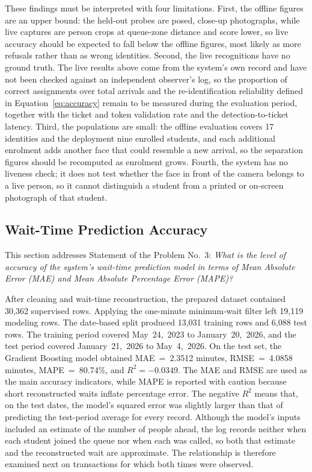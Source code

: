 \documentclass{research}
\begin{document}
These findings must be interpreted with four limitations. First, the
offline figures are an upper bound: the held-out probes are posed,
close-up photographs, while live captures are person crops at
queue-zone distance and score lower, so live accuracy should be expected
to fall below the offline figures, most likely as more refusals rather
than as wrong identities. Second, the live recognitions have no ground
truth. The live results above come from the system's own record and
have not been checked against an independent observer's log, so the
proportion of correct assignments over total arrivals and the
re-identification reliability defined in Equation~\ref{eq:accuracy}
remain to be measured during the evaluation period, together with the
ticket and token validation rate and the detection-to-ticket latency.
Third, the populations are small: the offline evaluation covers 17
identities and the deployment nine enrolled students, and each
additional enrolment adds another face that could resemble a new
arrival, so the separation figures should be recomputed as enrolment
grows. Fourth, the system has no liveness check; it does not test
whether the face in front of the camera belongs to a live person, so it
cannot distinguish a student from a printed or on-screen photograph of
that student.

\subsection{Wait-Time Prediction Accuracy}
\label{sec:sop3-results}

This section addresses Statement of the Problem No.~3: \emph{What is
the level of accuracy of the system's wait-time prediction model in
terms of Mean Absolute Error (MAE) and Mean Absolute Percentage Error
(MAPE)?}

\label{sec:wait-time-training-result}
After cleaning and wait-time reconstruction, the prepared dataset
contained 30,362 supervised rows. Applying the one-minute minimum-wait
filter left 19,119 modeling rows. The date-based split produced 13,031
training rows and 6,088 test rows. The training period covered
May~24,~2023 to January~20,~2026, and the test period covered
January~21,~2026 to May~4,~2026. On the test set, the Gradient
Boosting model obtained MAE~=~2.3512 minutes, RMSE~=~4.0858 minutes,
MAPE~=~80.74\%, and $R^2=-0.0349$. The MAE and RMSE are used as the
main accuracy indicators, while MAPE is reported with caution because
short reconstructed waits inflate percentage error. The negative $R^2$
means that, on the test dates, the model's squared error was slightly
larger than that of predicting the test-period average for every
record. Although the model's inputs included an estimate of the number
of people ahead, the log records neither when each student joined the
queue nor when each was called, so both that estimate and the
reconstructed wait are approximate. The relationship is therefore
examined next on transactions for which both times were observed.
\end{document}
